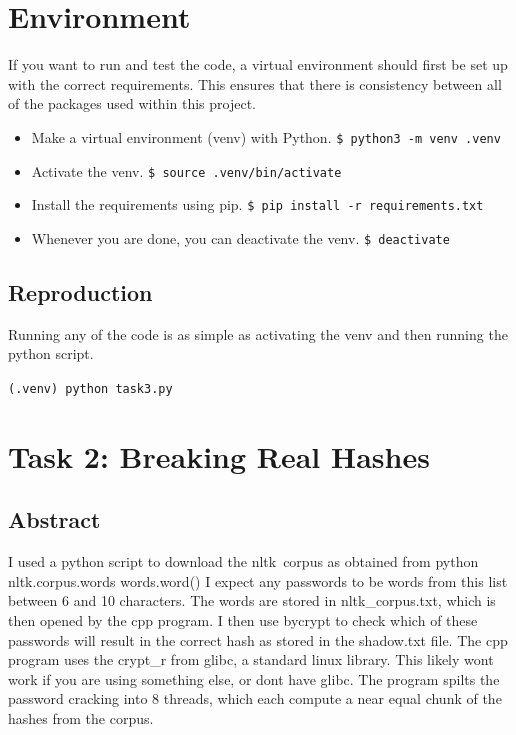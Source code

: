 \documentclass[11pt]{article}
\begin{document}
\section*{Environment}
If you want to run and test the code, a virtual environment should first be set up with the correct requirements. This ensures that there is consistency between all of the packages used within this project.

\begin{itemize}
	\item Make a virtual environment (venv) with Python.
		\verb|$ python3 -m venv .venv|
	\item Activate the venv.
		\verb|$ source .venv/bin/activate|
	\item Install the requirements using pip.
		\verb|$ pip install -r requirements.txt|
	\item Whenever you are done, you can deactivate the venv.
		\verb|$ deactivate|
\end{itemize}

\subsection*{Reproduction}
Running any of the code is as simple as activating the venv and then running the python script.

\verb|(.venv) python task3.py|

\section*{Task 2: Breaking Real Hashes}
\subsection*{Abstract}
I used a python script to download the nltk\ corpus as
obtained from python nltk.corpus.words words.word()
I expect any passwords to be words from this list between 6 and 10 characters.
The words are stored in nltk\_corpus.txt, which is then opened by the cpp program.
I then use bycrypt to check which of these passwords will result in the correct
hash as stored in the shadow.txt file.
The cpp program uses the crypt\_r from glibc, a standard linux library. 
This likely wont work if you are using something else, or dont have glibc. 
The program spilts the password cracking into 8 threads,
 which each compute a near equal chunk of the hashes from the corpus.
\end{document}
